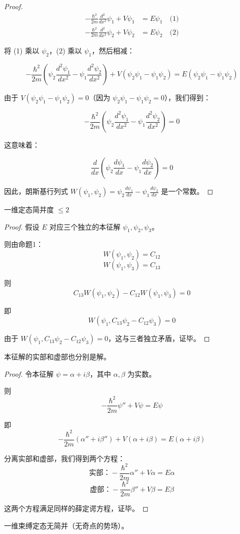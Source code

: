 \documentclass[lang=cn,10pt]{elegantbook}
\begin{document}
\begin{proof}
	\begin{align*}
		-\frac{\hbar^2}{2m} \frac{d^2}{dx^2} \psi_1 + V \psi_1 &= E \psi_1 \quad \text{(1)} \\
		-\frac{\hbar^2}{2m} \frac{d^2}{dx^2} \psi_2 + V \psi_2 &= E \psi_2 \quad \text{(2)}
	\end{align*}
	
	将 (1) 乘以 $\psi_2$，(2) 乘以 $\psi_1$，然后相减：
	
	\[
	-\frac{\hbar^2}{2m} \left( \psi_2 \frac{d^2 \psi_1}{dx^2} - \psi_1 \frac{d^2 \psi_2}{dx^2} \right) + V(\psi_2 \psi_1 - \psi_1 \psi_2) = E(\psi_2 \psi_1 - \psi_1 \psi_2)
	\]
	
	由于 $V(\psi_2 \psi_1 - \psi_1 \psi_2) = 0$（因为 $\psi_2 \psi_1 - \psi_1 \psi_2 = 0$），我们得到：
	
	\[
	-\frac{\hbar^2}{2m} \left( \psi_2 \frac{d^2 \psi_1}{dx^2} - \psi_1 \frac{d^2 \psi_2}{dx^2} \right) = 0
	\]
	
	这意味着：
	
	\[
	\frac{d}{dx} \left( \psi_2 \frac{d \psi_1}{dx} - \psi_1 \frac{d \psi_2}{dx} \right) = 0
	\]
	
	因此，朗斯基行列式 $W(\psi_1, \psi_2) = \psi_2 \frac{d \psi_1}{dx} - \psi_1 \frac{d \psi_2}{dx}$ 是一个常数。
\end{proof}

\begin{proposition}
	一维定态简并度 $\leq 2$
\end{proposition}

\begin{proof}
		假设 $E$ 对应三个独立的本征解 $\psi_1, \psi_2, \psi_3$。
	
	则由命题1：
	\[
		W(\psi_1, \psi_2) = C_{12}
	\]
	\[
		W(\psi_1, \psi_3) = C_{13}
	\]
	
	则
	\[
	C_{13} W(\psi_1, \psi_2) - C_{12} W(\psi_1, \psi_3) = 0
	\]
	
	即
	\[
	W(\psi_1, C_{13} \psi_2 - C_{12} \psi_3) = 0
	\]
	
	由于 $W(\psi_1, C_{13} \psi_2 - C_{12} \psi_3) = 0$，这与三者独立矛盾，证毕。
\end{proof} 

\begin{proposition}
	本征解的实部和虚部也分别是解。
\end{proposition}

\begin{proof}
	令本征解 $\psi = \alpha + i\beta$，其中 $\alpha, \beta$ 为实数。
	
	则
	\[
	-\frac{\hbar^2}{2m} \psi'' + V \psi = E \psi
	\]
	
	即
	\[
	-\frac{\hbar^2}{2m} (\alpha'' + i\beta'') + V(\alpha + i\beta) = E(\alpha + i\beta)
	\]
	
	分离实部和虚部，我们得到两个方程：
	\[
	\text{实部：} -\frac{\hbar^2}{2m} \alpha'' + V \alpha = E \alpha
	\]
	\[
	\text{虚部：} -\frac{\hbar^2}{2m} \beta'' + V \beta = E \beta
	\]
	
	这两个方程满足同样的薛定谔方程，证毕。
\end{proof}
\begin{proposition}
	一维束缚定态无简并（无奇点的势场）。
\end{proposition}
\end{document}
